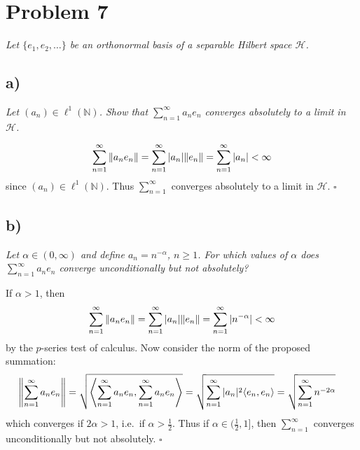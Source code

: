 \documentclass[12pt]{article}
\theoremstyle{plain}
\begin{document}


\section*{Problem 7}
\emph{Let $\{e_1, e_2, \dots\}$ be an orthonormal basis of a separable Hilbert space $\mathcal{H}$.}

\subsection*{ a)}
\emph{Let $(a_n) \in \ell^1(\mathbb{N})$.  Show that $\sum_{n=1}^\infty a_ne_n$ converges absolutely to a limit in $\mathcal{H}$.}

\begin{align*}
    \sum_{n=1}^\infty \norm{a_n e_n} = \sum_{n=1}^\infty |a_n|\norm{e_n} = \sum_{n=1}^\infty |a_n| < \infty
\end{align*}
since $(a_n) \in \ell^1(\mathbb{N})$.  Thus $\sum_{n=1}^\infty$ converges absolutely to a limit in $\mathcal{H}$. \hfill $\square$

\subsection*{ b)}
\emph{Let $\alpha \in (0, \infty)$ and define $a_n = n^{-\alpha}$, $n \geq 1$.  For which values of $\alpha$ does $\sum_{n=1}^\infty a_ne_n$ converge unconditionally but not absolutely?} \medskip

If $\alpha > 1$, then
\begin{align*}
    \sum_{n=1}^\infty \norm{a_ne_n} = \sum_{n=1}^\infty |a_n|\norm{e_n} = \sum_{n=1}^\infty |n^{-\alpha}| <\infty
\end{align*}
by the $p$-series test of calculus.  Now consider the norm of the proposed summation:
\begin{align*}
    \norm{\sum_{n=1}^\infty a_ne_n} &= \sqrt{\left\langle \sum_{n=1}^\infty a_ne_n, \sum_{n=1}^\infty a_ne_n\right\rangle} = \sqrt{\sum_{n=1}^\infty |a_n|^2 \langle e_n, e_n \rangle} = \sqrt{\sum_{n=1}^\infty n^{-2\alpha}}
\end{align*}
which converges if $2\alpha > 1$, i.e.~if $\alpha > \frac{1}{2}$.  Thus if $\alpha \in (\frac{1}{2}, 1]$, then $\sum_{n=1}^\infty$ converges unconditionally but not absolutely. \hfill $\square$
\end{document}
